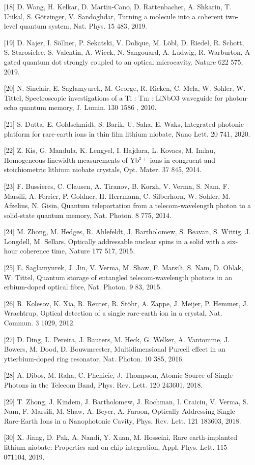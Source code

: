 \documentclass[prl,reprint,superscriptaddress]{revtex4-1}
\begin{document}
[18] 	D. Wang, H. Kelkar, D. Martin-Cano, D. Rattenbacher, A. Shkarin, T. Utikal, S. Götzinger, V. Sandoghdar, Turning a molecule into a coherent two-level quantum system, Nat. Phys. 15 483, 2019.

[19] 	D. Najer, I. Söllner, P. Sekatski, V. Dolique, M. Löbl, D. Riedel, R. Schott, S. Starosielec, S. Valentin, A. Wieck, N. Sangouard, A. Ludwig, R. Warburton, A gated quantum dot strongly coupled to an optical microcavity, Nature 622 575, 2019. 

[20] 	N. Sinclair, E. Saglamyurek, M. George, R. Ricken, C. Mela, W. Sohler, W. Tittel, Spectroscopic investigations of a Ti : Tm : LiNbO3 waveguide for photon-echo quantum memory, J. Lumin. 130 1586 , 2010. 

[21] 	S. Dutta, E. Goldschmidt, S. Barik, U. Saha, E. Waks, Integrated photonic platform for rare-earth ions in thin film lithium niobate, Nano Lett. 20 741, 2020. 

[22] 	Z. Kis, G. Mandula, K. Lengyel, I. Hajdara, L. Kovacs, M. Imlau, Homogeneous linewidth measurements of Yb$\mathrm{^{3+}}$ ions in congruent and stoichiometric lithium niobate crystals, Opt. Mater. 37 845, 2014. 

[23] 	F. Bussieres, C. Clausen, A. Tiranov, B. Korzh, V. Verma, S. Nam, F. Marsili, A. Ferrier, P. Goldner, H. Herrmann, C. Silberhorn, W. Sohler, M. Afzelius, N. Gisin, Quantum teleportation from a telecom-wavelength photon to a solid-state quantum memory, Nat. Photon. 8 775, 2014. 

[24] 	M. Zhong, M. Hedges, R. Ahlefeldt, J. Bartholomew, S. Beavan, S. Wittig, J. Longdell, M. Sellars, Optically addressable nuclear spins in a solid with a six-hour coherence time, Nature 177 517, 2015. 

[25] 	E. Saglamyurek, J. Jin, V. Verma, M. Shaw, F. Marsili, S. Nam, D. Oblak, W. Tittel, Quantum storage of entangled telecom-wavelength photons in an erbium-doped optical fibre, Nat. Photon. 9 83, 2015. 

[26] 	R. Kolesov, K. Xia, R. Reuter, R. Stöhr, A. Zappe, J. Meijer, P. Hemmer, J. Wrachtrup, Optical detection of a single rare-earth ion in a crystal, Nat. Commun.  3 1029, 2012. 

[27] 	D. Ding, L. Pereira, J. Bauters, M. Heck, G. Welker, A. Vantomme, J. Bowers, M. Dood, D. Bouwmeester, Multidimensional Purcell effect in an ytterbium-doped ring resonator, Nat. Photon.  10 385, 2016. 

[28] 	A. Dibos, M. Raha, C. Phenicie, J. Thompson, Atomic Source of Single Photons in the Telecom Band, Phys. Rev. Lett. 120 243601, 2018. 

[29] 	T. Zhong, J. Kindem, J. Bartholomew, J. Rochman, I. Craiciu, V. Verma, S. Nam, F. Marsili, M. Shaw, A. Beyer, A. Faraon, Optically Addressing Single Rare-Earth Ions in a Nanophotonic Cavity, Phys. Rev. Lett. 121 183603, 2018. 

[30] 	X. Jiang, D. Pak, A. Nandi, Y. Xuan, M. Hosseini, Rare earth-implanted lithium niobate: Properties and on-chip integration, Appl. Phys. Lett. 115 071104, 2019. 
\end{document}

